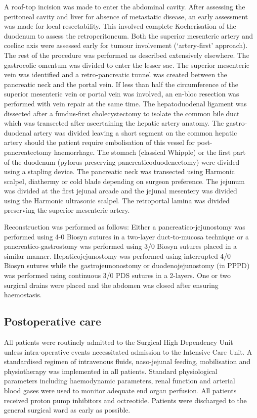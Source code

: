 A roof-top incision was made to enter the abdominal cavity. After assessing the peritoneal cavity and liver for absence of metastatic disease, an early assessment was made for local resectability. This involved complete Kocherisation of the duodenum to assess the retroperitoneum. Both the superior mesenteric artery and coeliac axis were assessed early for tumour involvement (‘artery-first’ approach). The rest of the procedure was performed as described extensively elsewhere. The gastrocolic omentum was divided to enter the lesser sac. The superior mesenteric vein was identified and a retro-pancreatic tunnel was created between the pancreatic neck and the portal vein. If less than half the circumference of the superior mesenteric vein or portal vein was involved, an en-bloc resection was performed with vein repair at the same time. The hepatoduodenal ligament was dissected after a fundus-first cholecystectomy to isolate the common bile duct which was transected after ascertaining the hepatic artery anatomy. The gastro-duodenal artery was divided leaving a short segment on the common hepatic artery should the patient require embolisation of this vessel for post-pancreatectomy haemorrhage. The stomach (classical Whipple) or the first part of the duodenum (pylorus-preserving pancreaticoduodenectomy) were divided using a stapling device. The pancreatic neck was transected using Harmonic scalpel, diathermy or cold blade depending on surgeon preference. The jejunum was divided at the first jejunal arcade and the jejunal mesentery was divided using the Harmonic ultrasonic scalpel. The retroportal lamina was divided preserving the superior mesenteric artery. 

Reconstruction was performed as follows: Either a pancreatico-jejunostomy was performed using 4-0 Biosyn sutures in a two-layer duct-to-mucosa technique or a pancreatico-gastrostomy was performed using 3/0 Biosyn sutures placed in a similar manner. Hepaticojejunostomy was performed using interrupted 4/0 Biosyn sutures while the gastrojeunonostomy or duodenojejunostomy (in PPPD) was performed using continuous 3/0 PDS sutures in a 2-layers. One or two surgical drains were placed and the abdomen was closed after ensuring haemostasis.

\subsection{Postoperative care}
All patients were routinely admitted to the Surgical High Dependency Unit unless intra-operative events necessitated admission to the Intensive Care Unit. A standardised regimen of intravenous fluids, naso-jejunal feeding, mobilisation and physiotherapy was implemented in all patients. Standard physiological parameters including haemodynamic parameters, renal function and arterial blood gases were used to monitor adequate end organ perfusion. All patients received proton pump inhibitors and octreotide. Patients were discharged to the general surgical ward as early as possible.

